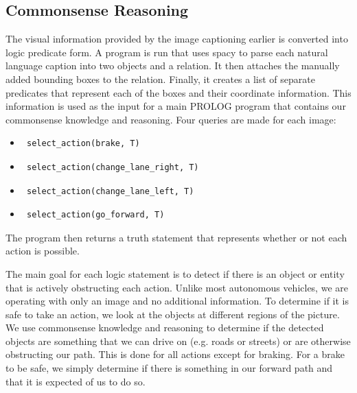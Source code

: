 \subsection{Commonsense Reasoning}
The visual information provided by the image captioning earlier is converted into logic predicate form. A program is run that uses spacy\cite{spacy2} to parse each natural language caption into two objects and a relation. It then attaches the manually added bounding boxes to the relation. Finally, it creates a list of separate predicates that represent each of the boxes and their coordinate information. This information is used as the input for a main PROLOG program that contains our commonsense knowledge and reasoning. Four queries are made for each image:
\begin{itemize}
\item \begin{verbatim} select_action(brake, T)
\end{verbatim}
\item \begin{verbatim} select_action(change_lane_right, T)
\end{verbatim}
\item \begin{verbatim} select_action(change_lane_left, T)
\end{verbatim}
\item \begin{verbatim} select_action(go_forward, T)
\end{verbatim}
\end{itemize}
The program then returns a truth statement that represents whether or not each action is possible. 

The main goal for each logic statement is to detect if there is an object or entity that is actively obstructing each action. Unlike most autonomous vehicles, we are operating with only an image and no additional information. To determine if it is safe to take an action, we look at the objects at different regions of the picture. We use commonsense knowledge and reasoning to determine if the detected objects are something that we can drive on (e.g. roads or streets) or are otherwise obstructing our path. This is done for all actions except for braking. For a brake to be safe, we simply determine if there is something in our forward path and that it is expected of us to do so. 
